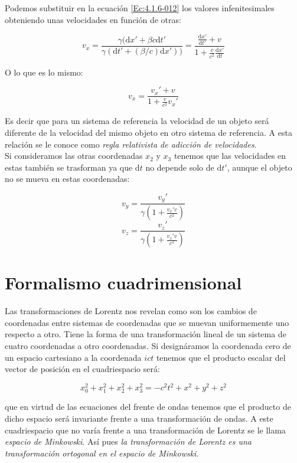 \documentclass[12pt,a4paper]{book}
\newcommand{\D}{\mathrm{d}}
\begin{document}
Podemos substituir en la ecuación \ref{Ec:4.1.6-012} los valores infenitesimales obteniendo unas velocidades en función de otras:

$$
v_x = \dfrac{\gamma (\D x' + \beta c \D t'}{\gamma (\D t' + (\beta/c) \D x'))} = \dfrac{\frac{\D x'}{\D t'} + v }{1+\frac{v}{c^2} \frac{\D x'}{\D t}}
$$

O lo que es lo mismo:

\begin{equation}
v_x = \dfrac{v_x'+v }{1 + \frac{v}{c^2} v_x'}
\end{equation}

Es decir que para un sistema de referencia la velocidad de un objeto será diferente de la velocidad del mismo objeto en otro sistema de referencia. A esta relación se le conoce como \textit{regla relativista de adicción de velocidades}. \\

Si consideramos las otras coordenadas $x_2$ y $x_3$ tenemos que las velocidades en estas también se trasforman ya que $\D t$ no depende solo de $\D t'$, aunque el objeto no se mueva en estas coordenadas:


\begin{equation}
v_y = \dfrac{v_y'}{\gamma(1 + \frac{v_x' v}{c^2})}
\end{equation}
\begin{equation}
v_z =  \dfrac{v_z'}{\gamma(1 + \frac{v_x' v}{c^2})}
\end{equation}




\section{Formalismo cuadrimensional}



Las transformaciones de Lorentz nos revelan como son los cambios de coordenadas entre sistemas de coordenadas que se muevan uniformemente uno respecto a otro. Tiene la forma de una transformación lineal de un sistema de cuatro coordenadas a otro coordenadas. Si designáramos la coordenada cero de un espacio cartesiano a la coordenada $i ct$ tenemos que el producto escalar del vector de posición en el cuadriespacio será:

\begin{equation}
x_0^2 + x_1^2 + x_2^2 + x_3^2 = -c^2 t^2 + x^2 + y^2 + z^2 
\label{Ec:4.2.0-016}
\end{equation}

que en virtud de las ecuaciones del frente de ondas tenemos que el producto de dicho espacio será invariante frente a una transformación de ondas. A este cuadriespacio que no varía frente a una transformación de Lorentz se le llama \textit{espacio de Minkowski}. Así pues \textit{la transformación de Lorentz es una transformación ortogonal en el espacio de Minkowski}.\\
\end{document}
